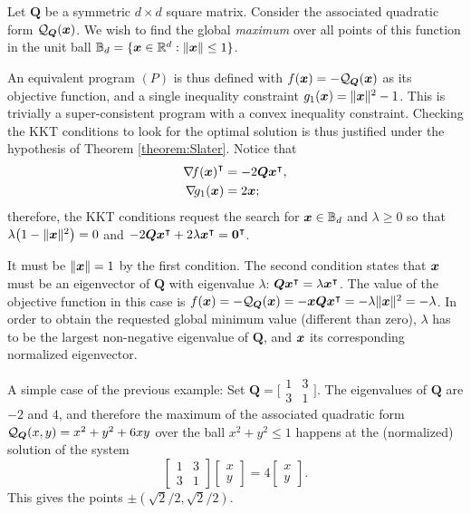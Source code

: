 \begin{example}
Let $\boldsymbol{Q}$ be a symmetric $d \times d$ square matrix.  Consider the associated quadratic form $\mathcal{Q}_{\boldsymbol{Q}}(\boldsymbol{x})$.  We wish to find the global \emph{maximum} over all points of this function in the unit ball $\mathbb{B}_d = \{ \boldsymbol{x} \in \mathbb{R}^d : \lVert \boldsymbol{x} \rVert \leq 1 \}$.

An equivalent program $(P)$ is thus defined with $f(\boldsymbol{x}) = -\mathcal{Q}_{\boldsymbol{Q}}(\boldsymbol{x})$ as its objective function, and a single inequality constraint $g_1(\boldsymbol{x}) = \lVert \boldsymbol{x} \rVert^2-1$. This is trivially a super-consistent program with a convex inequality constraint.  Checking the KKT conditions to look for the optimal solution is thus justified under the hypothesis of Theorem \ref{theorem:Slater}.  Notice that
\begin{align*}
{\mathop{\nabla\! {f}}(\boldsymbol{x})}^\intercal &= -2 \boldsymbol{Q} {\boldsymbol{x}}^\intercal, \\
\mathop{\nabla\! {g_1}}(\boldsymbol{x}) &= 2\boldsymbol{x};
\end{align*}
therefore, the KKT conditions request the search for $\boldsymbol{x} \in \mathbb{B}_d$ and $\lambda \geq 0$ so that $\lambda \big(1-\lVert \boldsymbol{x} \rVert^2 \big)=0$ and $-2\boldsymbol{Q} {\boldsymbol{x}}^\intercal + 2\lambda{\boldsymbol{x}}^\intercal = {\boldsymbol{0}}^\intercal$.  

It must be $\lVert \boldsymbol{x} \rVert=1$ by the first condition.  The second condition states that $\boldsymbol{x}$ must be an eigenvector of $\boldsymbol{Q}$ with eigenvalue $\lambda$: $\boldsymbol{Q} {\boldsymbol{x}}^\intercal = \lambda {\boldsymbol{x}}^\intercal$.  The value of the objective function in this case is $f(\boldsymbol{x}) = -\mathcal{Q}_{\boldsymbol{Q}}(\boldsymbol{x}) = -\boldsymbol{x} \boldsymbol{Q} {\boldsymbol{x}}^\intercal = -\lambda \lVert \boldsymbol{x} \rVert^2= -\lambda$.  In order to obtain the requested global minimum value (different than zero), $\lambda$ has to be the largest non-negative eigenvalue of $\boldsymbol{Q}$, and $\boldsymbol{x}$ its corresponding normalized eigenvector.
\end{example}

\begin{example}
A simple case of the previous example: Set $\boldsymbol{Q} = \big[ \begin{smallmatrix} 1 & 3 \\ 3 & 1 \end{smallmatrix}\big]$.  The eigenvalues of $\boldsymbol{Q}$ are $-2$ and $4$, and therefore the maximum of the associated quadratic form $\mathcal{Q}_{\boldsymbol{Q}}(x,y) = x^2+y^2+6xy$ over the ball $x^2+y^2\leq 1$ happens at the (normalized) solution of the system
\begin{equation*}
\begin{bmatrix} 1 & 3 \\ 3 & 1 \end{bmatrix} \begin{bmatrix} x \\ y \end{bmatrix} = 4\begin{bmatrix} x \\ y \end{bmatrix}.
\end{equation*}
This gives the points $\pm(\sqrt{2}/2, \sqrt{2}/2)$.
\end{example}

